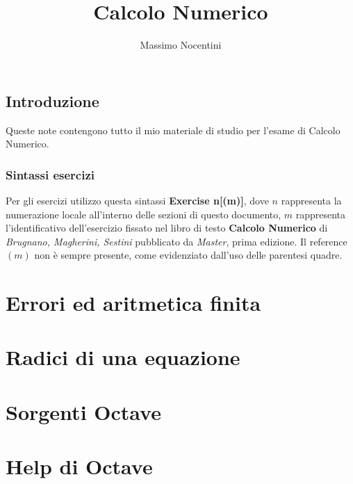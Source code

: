 \documentclass[11pt, a4paper]{report}
\title{Calcolo Numerico}
\author{Massimo Nocentini}
\begin{document}
\lstset{
	language = octave
	, numbers = left 
	, basicstyle=\footnotesize
	, frame=single
	, tabsize=2
	, captionpos=b
	, breaklines=true
	, showspaces=false
	, showstringspaces=false
}

\maketitle

\tableofcontents

\newpage

\section*{Introduzione}
Queste note contengono tutto il mio materiale di studio per l'esame di Calcolo Numerico.

\subsection*{Sintassi esercizi}
Per gli esercizi utilizzo questa sintassi \textbf{Exercise n[(m)]}, dove $n$
rappresenta la numerazione locale all'interno delle sezioni di questo documento, 
$m$ rappresenta l'identificativo dell'esercizio fissato nel libro di testo 
\textbf{Calcolo Numerico} di \emph{Brugnano, Magherini, Sestini} pubblicato da \emph{Master}, 
prima edizione.
Il reference $(m)$ non \`e sempre presente, come evidenziato dall'uso delle parentesi quadre.

\chapter{Errori ed aritmetica finita}





\chapter{Radici di una equazione}



\chapter{Sorgenti Octave}



\chapter{Help di Octave}


\end{document}
